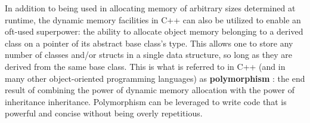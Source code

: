 \documentclass[man,12pt]{apa6}
\begin{document}
In addition to being used in allocating memory of arbitrary sizes determined
at runtime, the dynamic memory facilities in C++ can also be utilized to enable
an oft-used superpower: the ability to allocate object memory belonging to a
derived class on a pointer of its abstract base class's type.  This allows one
to store any number of \textsf{class}es and/or \textsf{struct}s in a single
data structure, so long as they are derived from the same base class.  This is 
what is referred to in C++ (and in many other
object-oriented programming\parencite{digms} languages) as \textbf{polymorphism}
\parencite{poly-tut}: the end result of combining the power of dynamic memory
allocation with the power of inheritance
inheritance\parencite{inh-g4g}.  Polymorphism can be leveraged to write code
that is powerful and concise without being overly repetitious.
\end{document}
